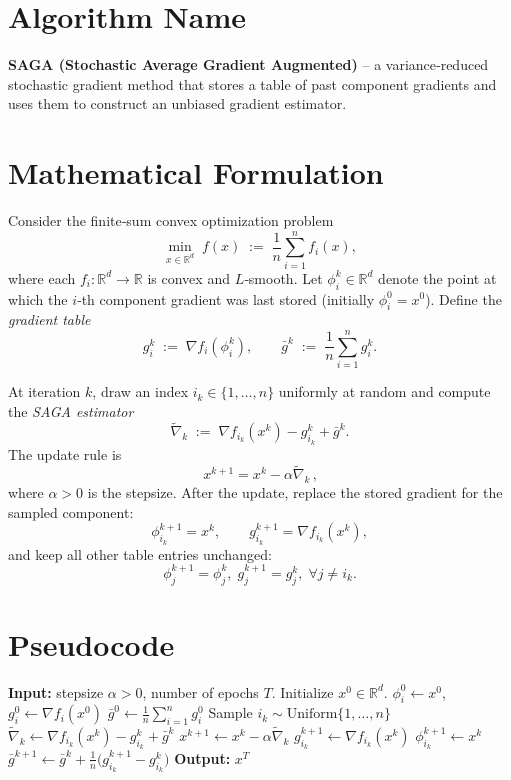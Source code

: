 \documentclass[11pt]{article}
\newcommand{\R}{\mathbb{R}}
\begin{document}
\section*{Algorithm Name}
\textbf{SAGA (Stochastic Average Gradient Augmented)} – a variance‑reduced stochastic gradient method that stores a table of past component gradients and uses them to construct an unbiased gradient estimator.

\section*{Mathematical Formulation}
Consider the finite‑sum convex optimization problem
\[
\min_{x\in\R^{d}} \; f(x) \;:=\; \frac{1}{n}\sum_{i=1}^{n} f_i(x),
\]
where each $f_i:\R^{d}\!\to\!\R$ is convex and $L$‑smooth.  
Let $\phi_i^{k}\in\R^{d}$ denote the point at which the $i$‑th component gradient was last stored (initially $\phi_i^{0}=x^{0}$).  
Define the \emph{gradient table}
\[
g_i^{k}\;:=\;\nabla f_i(\phi_i^{k}),\qquad 
\bar g^{k}\;:=\;\frac{1}{n}\sum_{i=1}^{n} g_i^{k}.
\]

At iteration $k$, draw an index $i_k\in\{1,\dots,n\}$ uniformly at random and compute the \emph{SAGA estimator}
\[
\tilde{\nabla}_k \;:=\; \nabla f_{i_k}(x^{k}) - g_{i_k}^{k} + \bar g^{k}.
\]
The update rule is
\[
\boxed{\,x^{k+1}=x^{k}-\alpha \tilde{\nabla}_k\,},
\]
where $\alpha>0$ is the stepsize.  
After the update, replace the stored gradient for the sampled component:
\[
\phi_{i_k}^{k+1}=x^{k},\qquad g_{i_k}^{k+1}= \nabla f_{i_k}(x^{k}),
\]
and keep all other table entries unchanged:
\[
\phi_{j}^{k+1}= \phi_{j}^{k},\; g_{j}^{k+1}=g_{j}^{k},\;\forall j\neq i_k .
\]

\section*{Pseudocode}
\begin{algorithm}[H]
\caption{SAGA}
\begin{algorithmic}[1]
\State \textbf{Input:} stepsize $\alpha>0$, number of epochs $T$.
\State Initialize $x^{0}\in\R^{d}$.
    \State $\phi_i^{0}\gets x^{0}$,\quad $g_i^{0}\gets \nabla f_i(x^{0})$
\EndFor
\State $\bar g^{0}\gets \frac{1}{n}\sum_{i=1}^{n} g_i^{0}$
    \State Sample $i_k\sim\text{Uniform}\{1,\dots,n\}$
    \State $\tilde{\nabla}_k \gets \nabla f_{i_k}(x^{k})-g_{i_k}^{k}+\bar g^{k}$
    \State $x^{k+1}\gets x^{k}-\alpha \tilde{\nabla}_k$
    \State $g_{i_k}^{k+1}\gets \nabla f_{i_k}(x^{k})$
    \State $\phi_{i_k}^{k+1}\gets x^{k}$
    \State $\bar g^{k+1}\gets \bar g^{k}+ \frac{1}{n}\bigl(g_{i_k}^{k+1}-g_{i_k}^{k}\bigr)$
\EndFor
\State \textbf{Output:} $x^{T}$
\end{algorithmic}
\end{algorithm}
\end{document}
